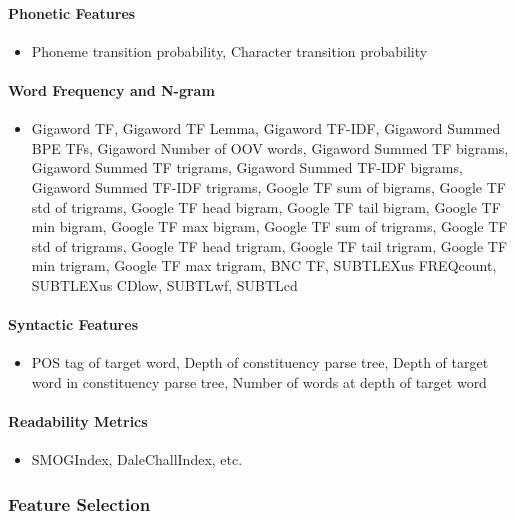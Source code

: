 \documentclass[11pt,a4paper]{article}
\begin{document}
\paragraph{Phonetic Features}

\begin{itemize}
  \item Phoneme transition probability, Character transition probability
\end{itemize}

\paragraph{Word Frequency and N-gram}

\begin{itemize}
  \item Gigaword TF, Gigaword TF Lemma, Gigaword TF-IDF, Gigaword Summed BPE TFs, Gigaword Number of OOV words, Gigaword Summed TF bigrams, Gigaword Summed TF trigrams, Gigaword Summed TF-IDF bigrams, Gigaword Summed TF-IDF trigrams, Google TF sum of bigrams, Google TF std of trigrams, Google TF head bigram, Google TF tail bigram, Google TF min bigram, Google TF max bigram, Google TF sum of trigrams, Google TF std of trigrams, Google TF head trigram, Google TF tail trigram, Google TF min trigram, Google TF max trigram, BNC TF, SUBTLEXus FREQcount, SUBTLEXus CDlow, SUBTLwf, SUBTLcd
\end{itemize}

\paragraph{Syntactic Features}

\begin{itemize}
  \item POS tag of target word, Depth of constituency parse tree, Depth of target word in constituency parse tree, Number of words at depth of target word
\end{itemize}

\paragraph{Readability Metrics}

\begin{itemize}
  \item SMOGIndex, DaleChallIndex, etc.
\end{itemize}

\subsubsection{Feature Selection}
\end{document}
